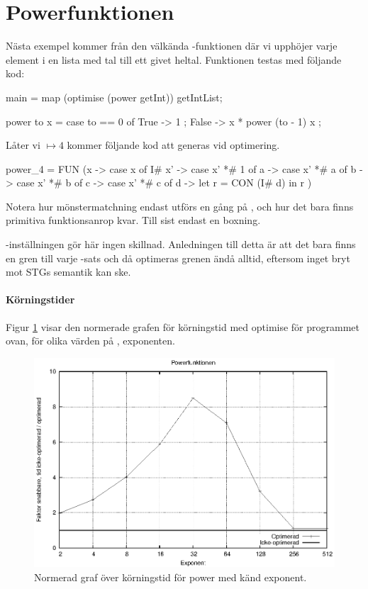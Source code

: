 \documentclass[Rapport]{subfiles}
\begin{document}
\section{Powerfunktionen}
Nästa exempel kommer från den välkända -funktionen där vi upphöjer varje element i en lista med tal till ett givet heltal. Funktionen testas med följande kod:
\begin{codeEx}
main = map (optimise (power getInt)) getIntList;

power to x = case to == 0 of
    { True  -> 1
    ; False -> x * power (to - 1) x
    };
\end{codeEx}

Låter vi  $\mapsto 4$ kommer följande kod att generas vid optimering.

\begin{codeEx}
power_4 = FUN (x -> case x of
    { I# x' -> case x' *# 1 of
       { a -> case x' *# a of
          { b -> case x' *# b of
             { c -> case x' *# c of
                { d -> let
                   { r = CON (I# d)
                   } in r
                }
             }
          }
       }
    })
\end{codeEx}

Notera hur mönstermatchning endast utförs en gång på , och hur det bara
finns primitiva funktionsanrop kvar. Till sist endast en boxning. 

-inställningen gör här ingen skillnad. 
Anledningen till detta är att det bara finns en gren till varje -sats
och då optimeras grenen ändå alltid, eftersom inget bryt mot STGs semantik kan ske.

\paragraph{Körningstider}

Figur \ref{fig:Resultat:shapes:graf} visar den normerade grafen för körningstid
med optimise för programmet ovan, för olika värden på , exponenten.

\begin{figure}[H]
\includegraphics{powernorm.eps}
\caption{Normerad graf över körningstid för power med känd exponent.}
\label{fig:Resultat:shapes:graf}
\end{figure}
\end{document}
